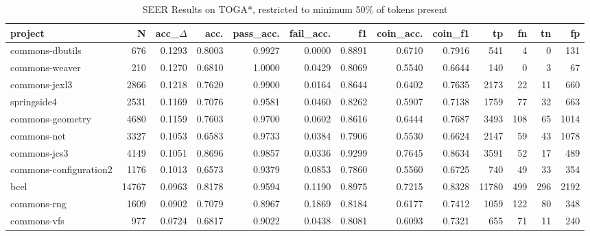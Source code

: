 \begin{table*}
\centering
\caption{SEER Results on TOGA*, restricted to minimum 50\% of tokens present}
\label{tab:toga_results_50}
\begin{tabular}{lrrrrrrrrrrrr}
\toprule
                project &       N &  acc\_$\Delta$ &    acc. &  pass\_acc. &  fail\_acc. &      f1 &  coin\_acc. &  coin\_f1 &      tp &    fn &   tn &     fp \\
\midrule
        commons-dbutils &     676 &      0.1293 &  0.8003 &     0.9927 &     0.0000 &  0.8891 &     0.6710 &   0.7916 &     541 &     4 &    0 &    131 \\
         commons-weaver &     210 &      0.1270 &  0.6810 &     1.0000 &     0.0429 &  0.8069 &     0.5540 &   0.6644 &     140 &     0 &    3 &     67 \\
          commons-jexl3 &    2866 &      0.1218 &  0.7620 &     0.9900 &     0.0164 &  0.8644 &     0.6402 &   0.7635 &    2173 &    22 &   11 &    660 \\
            springside4 &    2531 &      0.1169 &  0.7076 &     0.9581 &     0.0460 &  0.8262 &     0.5907 &   0.7138 &    1759 &    77 &   32 &    663 \\
       commons-geometry &    4680 &      0.1159 &  0.7603 &     0.9700 &     0.0602 &  0.8616 &     0.6444 &   0.7687 &    3493 &   108 &   65 &   1014 \\
            commons-net &    3327 &      0.1053 &  0.6583 &     0.9733 &     0.0384 &  0.7906 &     0.5530 &   0.6624 &    2147 &    59 &   43 &   1078 \\
           commons-jcs3 &    4149 &      0.1051 &  0.8696 &     0.9857 &     0.0336 &  0.9299 &     0.7645 &   0.8634 &    3591 &    52 &   17 &    489 \\
 commons-configuration2 &    1176 &      0.1013 &  0.6573 &     0.9379 &     0.0853 &  0.7860 &     0.5560 &   0.6725 &     740 &    49 &   33 &    354 \\
                   bcel &   14767 &      0.0963 &  0.8178 &     0.9594 &     0.1190 &  0.8975 &     0.7215 &   0.8328 &   11780 &   499 &  296 &   2192 \\
            commons-rng &    1609 &      0.0902 &  0.7079 &     0.8967 &     0.1869 &  0.8184 &     0.6177 &   0.7412 &    1059 &   122 &   80 &    348 \\
            commons-vfs &     977 &      0.0724 &  0.6817 &     0.9022 &     0.0438 &  0.8081 &     0.6093 &   0.7321 &     655 &    71 &   11 &    240 \\

\end{tabular}
\end{table*}
